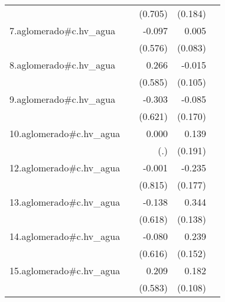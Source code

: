 {\begin{longtable}{l*{4}{D{.}{.}{-1}}}
            &                     &     (0.705)         &     (0.184)         &                     \\
\addlinespace
7.aglomerado#c.hv\_agua&                     &      -0.097         &       0.005         &                     \\
            &                     &     (0.576)         &     (0.083)         &                     \\
\addlinespace
8.aglomerado#c.hv\_agua&                     &       0.266         &      -0.015         &                     \\
            &                     &     (0.585)         &     (0.105)         &                     \\
\addlinespace
9.aglomerado#c.hv\_agua&                     &      -0.303         &      -0.085         &                     \\
            &                     &     (0.621)         &     (0.170)         &                     \\
\addlinespace
10.aglomerado#c.hv\_agua&                     &       0.000         &       0.139         &                     \\
            &                     &         (.)         &     (0.191)         &                     \\
\addlinespace
12.aglomerado#c.hv\_agua&                     &      -0.001         &      -0.235         &                     \\
            &                     &     (0.815)         &     (0.177)         &                     \\
\addlinespace
13.aglomerado#c.hv\_agua&                     &      -0.138         &       0.344\sym{*}  &                     \\
            &                     &     (0.618)         &     (0.138)         &                     \\
\addlinespace
14.aglomerado#c.hv\_agua&                     &      -0.080         &       0.239         &                     \\
            &                     &     (0.616)         &     (0.152)         &                     \\
\addlinespace
15.aglomerado#c.hv\_agua&                     &       0.209         &       0.182         &                     \\
            &                     &     (0.583)         &     (0.108)         &                     \\

\end{longtable}}
